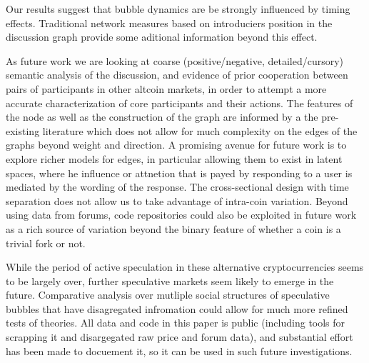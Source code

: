Our results suggest that bubble dynamics are be strongly influenced by timing effects. Traditional network measures based on introduciers position in the discussion graph provide some aditional  information beyond this effect.





As future work we are looking at coarse (positive/negative, detailed/cursory) semantic analysis of the discussion, and evidence of prior cooperation between pairs of participants in other altcoin markets, in order to attempt a more accurate characterization of core participants and their actions.
The features of the node as well as the construction of the graph are informed by a the pre-existing literature which does not allow for much complexity on the edges of the graphs beyond weight and direction.
A promising avenue for future work is to explore richer models for edges, in particular allowing them to exist in latent spaces, where he influence or attnetion that is payed by responding to a user is mediated by the wording of the response. 
The cross-sectional design with time separation does not allow us to take advantage of intra-coin variation.
Beyond using data from forums, code repositories could also be exploited in future work as a rich source of variation beyond the binary feature of whether a coin is a trivial fork or not.




While the period of active speculation in these alternative cryptocurrencies seems to be largely over, further speculative markets seem likely to emerge in the future. Comparative analysis over mutliple social structures of speculative bubbles that have disagregated infromation could allow for much more refined tests of theories. 
All data and code in this paper is public (including tools for scrapping it and disargegated raw price and forum data), and substantial effort has been made to docuement it, so it can be used in such future investigations. 

